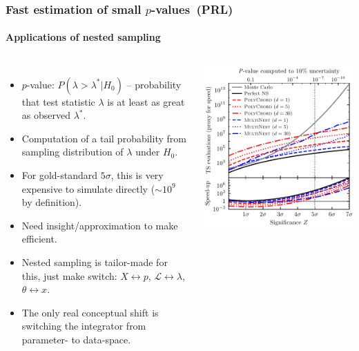 \documentclass[aspectratio=169]{beamer}
\begin{document}
\begin{frame}
    \frametitle{Fast estimation of small $p$-values~(PRL)}
    \framesubtitle{Applications of nested sampling}
    \begin{columns}
        \begin{itemize}
            \item $p$-value: $P(\lambda>\lambda^*|H_0)$ -- probability that test statistic $\lambda$ is at least as great as observed $\lambda^*$.
            \item Computation of a tail probability from sampling distribution of $\lambda$ under $H_0$.
            \item For gold-standard $5\sigma$, this is very expensive to simulate directly ($\sim10^9$ by definition).
            \item Need insight/approximation to make efficient.
            \item Nested sampling is tailor-made for this, just make switch: $X\leftrightarrow p$, $\mathcal{L}\leftrightarrow\lambda$, $\theta \leftrightarrow x$.
            \item The only real conceptual shift is switching the integrator from parameter- to data-space.
        \end{itemize}
        \includegraphics[width=\textwidth]{figures/pvalue.pdf}
    \end{columns}
\end{frame}
\end{document}
